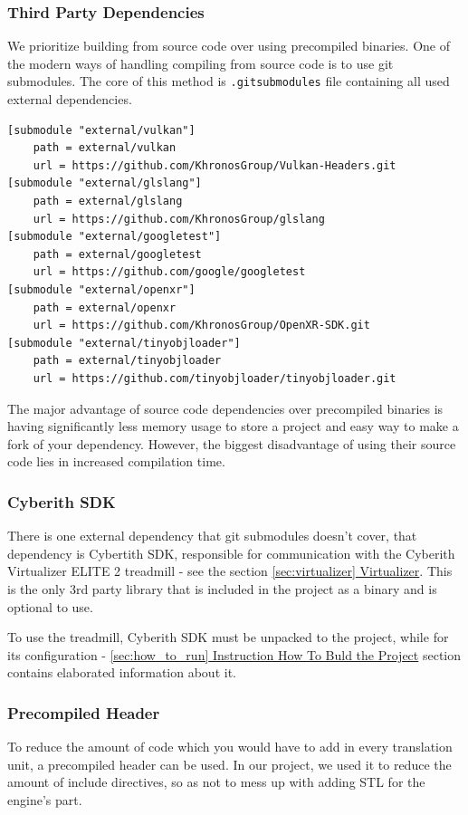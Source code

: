 \newpage
\subsubsection{Third Party Dependencies}
\label{sec:3rdparty}
\hspace{\parindent} We prioritize building from source code over using precompiled binaries.
One of the modern ways of handling compiling from source code is to use git submodules. The core of this method is \texttt{.gitsubmodules} file containing all used external dependencies.
\begin{lstlisting}[caption=.gitsubmodules]
[submodule "external/vulkan"]
	path = external/vulkan
	url = https://github.com/KhronosGroup/Vulkan-Headers.git
[submodule "external/glslang"]
	path = external/glslang
	url = https://github.com/KhronosGroup/glslang
[submodule "external/googletest"]
	path = external/googletest
	url = https://github.com/google/googletest
[submodule "external/openxr"]
	path = external/openxr
	url = https://github.com/KhronosGroup/OpenXR-SDK.git
[submodule "external/tinyobjloader"]
	path = external/tinyobjloader
	url = https://github.com/tinyobjloader/tinyobjloader.git
\end{lstlisting}

The major advantage of source code dependencies over precompiled binaries is having significantly less memory usage to store a project and easy way to make a fork of your dependency. However, the biggest disadvantage of using their source code lies in increased compilation time.

\subsubsection{Cyberith SDK}
\label{sec:build_cybsdk}
\hspace{\parindent} There is one external dependency that git submodules doesn't cover, that dependency is Cybertith SDK, responsible for communication with the Cyberith Virtualizer ELITE 2 treadmill - see the section \hyperref[sec:virtualizer]{\ref*{sec:virtualizer} Virtualizer}. This is the only 3rd party library that is included in the project as a binary and is optional to use.

To use the treadmill, Cyberith SDK must be unpacked to the project, while for its configuration - \hyperref[sec:how_to_run]{\ref*{sec:how_to_run} Instruction How To Buld the Project} section contains elaborated information about it.  

\subsubsection{Precompiled Header}
\hspace{\parindent} To reduce the amount of code which you would have to add in every translation unit, a precompiled header can be used. In our project, we used it to reduce the amount of include directives, so as not to mess up with adding STL for the engine's part.

